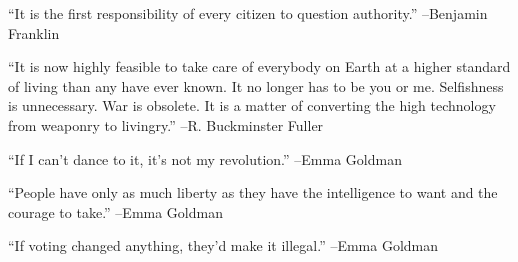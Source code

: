 \documentclass{article}%
\begin{document}
\vspace{1mm}%
\begin{minipage}{\textwidth}%
\flushleft%
“It is the first responsibility of every citizen to question authority.”%
\linebreak%
\vspace{1mm}%
–Benjamin Franklin%
\linebreak%
\vspace{1mm}%
\end{minipage}%
\linebreak%
\vspace{1mm}%
\begin{minipage}{\textwidth}%
\flushleft%
“It is now highly feasible to take care of everybody on Earth at a higher standard of living than any have ever known. It no longer has to be you or me. Selfishness is unnecessary. War is obsolete. It is a matter of converting the high technology from weaponry to livingry.”%
\linebreak%
\vspace{1mm}%
–R. Buckminster Fuller%
\linebreak%
\vspace{1mm}%
\end{minipage}%
\linebreak%
\vspace{1mm}%
\begin{minipage}{\textwidth}%
\flushleft%
“If I can't dance to it, it's not my revolution.”%
\linebreak%
\vspace{1mm}%
–Emma Goldman%
\linebreak%
\vspace{1mm}%
\end{minipage}%
\linebreak%
\vspace{1mm}%
\begin{minipage}{\textwidth}%
\flushleft%
“People have only as much liberty as they have the intelligence to want and the courage to take.”%
\linebreak%
\vspace{1mm}%
–Emma Goldman%
\linebreak%
\vspace{1mm}%
\end{minipage}%
\linebreak%
\vspace{1mm}%
\begin{minipage}{\textwidth}%
\flushleft%
“If voting changed anything, they'd make it illegal.”%
\linebreak%
\vspace{1mm}%
–Emma Goldman%
\linebreak%
\vspace{1mm}%
\end{minipage}%
\end{document}
